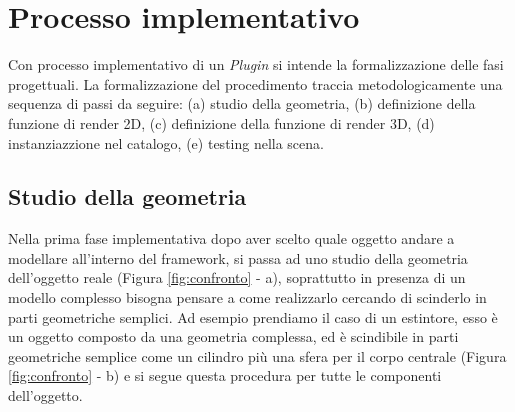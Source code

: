 \section{Processo implementativo}
\label{sec:chapter_3_section_5}

Con processo implementativo di un \emph{Plugin} si intende la formalizzazione delle fasi progettuali.
La formalizzazione del procedimento traccia metodologicamente una sequenza di passi da seguire:
(a) studio della geometria, (b) definizione della funzione di render 2D, (c) definizione della funzione di render 3D,
 (d) instanziazzione nel catalogo, (e) testing nella scena.


\subsection{Studio della geometria}
Nella prima fase implementativa dopo aver scelto quale oggetto andare a modellare all'interno del framework,
si passa ad uno studio della geometria dell'oggetto reale (Figura \ref{fig:confronto} - a), soprattutto in presenza di un modello complesso bisogna
pensare a come realizzarlo cercando di scinderlo in parti geometriche semplici. Ad esempio prendiamo il caso
di un estintore, esso è un oggetto composto da una geometria complessa, ed è scindibile in parti geometriche semplice
come un cilindro più una sfera per il corpo centrale (Figura \ref{fig:confronto} - b) e si segue questa procedura
per tutte le componenti dell'oggetto.\\

